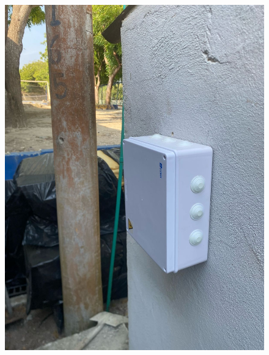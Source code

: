 \documentclass[12pt]{article}
\begin{document}
\begin{itemize}
\begin{figure}[h!]
\begin{minipage}[b]{0.48\textwidth}
                  \end{minipage}
                  \hfill
                  \begin{minipage}[b]{0.48\textwidth}
                        \includegraphics[width=\textwidth]{imagenes/box.jpg}
                  \end{minipage}
            \end{figure}

\end{itemize}
\end{document}
